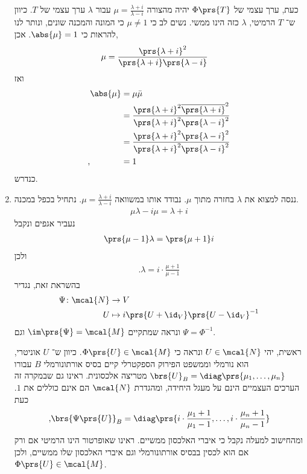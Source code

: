 \documentclass[a4paper,10pt,twoside,openany]{book}
\begin{document}
\begin{exercisechap}
\begin{solution}
\begin{enumerate}
כעת, ערך עצמי של
$\Phi\prs{T}$
יהיה מהצורה
$\mu = \frac{\lambda + i}{\lambda - i}$
עבור
$\lambda$
ערך עצמי של
$T$.
כיוון ש־%
$T$
הרמיטי,
$\lambda$
כזה הינו ממשי.
נשים לב כי
$\mu \neq 1$
כי המונה והמכנה שונים, ונותר לנו להראות כי
$\abs{\mu} = 1$.
אכן,
\begin{align*}
\mu &= \frac{\prs{\lambda + i}^2}{\prs{\lambda + i}\prs{\lambda - i}}
\end{align*}
ואז
\begin{align*}
\abs{\mu} &= \mu \bar{\mu}
\\&= \frac{\prs{\lambda + i}^2 \overline{\prs{\lambda + i}}^2}{\prs{\lambda + i}^2\prs{\lambda - i}^2}
\\&= \frac{\prs{\lambda + i}^2\prs{\lambda - i}^2}{\prs{\lambda + i}^2\prs{\lambda - i}^2}
\\ \text{,} \hphantom{\abs{\mu}} &= 1
\end{align*}
כנדרש.

\item
ננסה למצוא את
$\lambda$
בחזרה מתוך
$\mu$.
נבודד אותו במשוואה
$\mu = \frac{\lambda + i}{\lambda - i}$.
נתחיל בכפל במכנה.
\begin{align*}
\mu \lambda - i \mu = \lambda + i
\end{align*}
נעביר אגפים ונקבל
\begin{align*}
\prs{\mu - 1}\lambda = \prs{\mu + 1}i
\end{align*}
ולכן
\begin{align*}
\text{.} \lambda = i \cdot \frac{\mu + 1}{\mu - 1}
\end{align*}
בהשראת זאת, נגדיר
\begin{align*}
\Psi \colon \mcal{N} &\to V \\
U &\mapsto i \prs{U + \id_V}\prs{U - \id_V}^{-1}
\end{align*}
ונראה שמתקיים
$\im\prs{\Psi} = \mcal{M}$
וגם
$\Psi = \Phi^{-1}$.

ראשית, יהי
$U \in \mcal{N}$
ונראה כי
$\Phi\prs{U} \in \mcal{M}$.
כיוון ש־%
$U$
אוניטרי, הוא נורמלי וממשפט הפירוק הספקטרלי קיים בסיס אורתונורמלי
$B$
עבורו
$\brs{U}_B = \diag\prs{\mu_1, \ldots, \mu_n}$
מטריצה אלכסונית. ראינו גם שבמקרה זה הערכים העצמיים הינם על מעגל היחידה, ומהגדרת
$\mcal{N}$
הם אינם כוללים את
$1$.
כעת
\[\text{,} \brs{\Psi\prs{U}}_B = \diag\prs{i \cdot \frac{\mu_1 + 1}{\mu_1 - 1}, \ldots, i \cdot \frac{\mu_n + 1}{\mu_n - 1}}\]
ומהחישוב למעלה נקבל כי איברי האלכסון ממשיים. ראינו שאופרטור הינו הרמיטי אם ורק אם הוא לכסין בבסיס אורתונורמלי וגם איברי האלכסון שלו ממשיים, ולכן
$\Phi\prs{U} \in \mcal{M}$.


\end{enumerate}
\end{solution}
\end{exercisechap}
\end{document}

